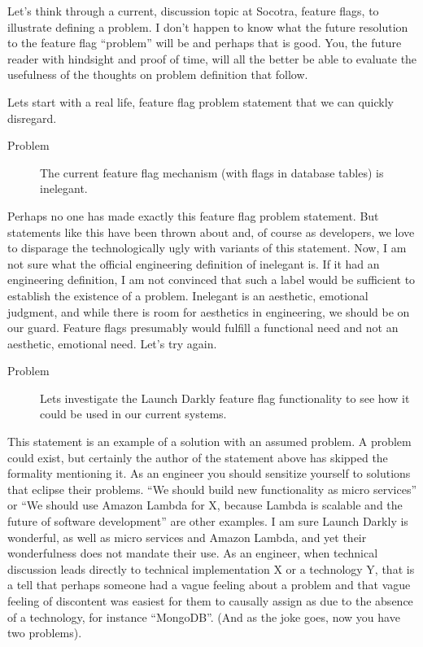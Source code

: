 Let's think through a current, discussion topic at Socotra, feature flags, to illustrate defining a problem. I don't happen to know what the
future resolution to the feature flag ``problem'' will be and perhaps that is good. You, the future reader with hindsight and proof of time, will
all the better be able to evaluate the usefulness of the thoughts on problem definition that follow.

Lets start with a real life, feature flag problem statement that we can quickly disregard.
\begin{description}
\item[Problem] The current feature flag
mechanism (with flags in database tables) is inelegant.
\end{description}
Perhaps no one has made exactly this feature flag problem statement. But statements like this have been thrown about and, of course as
developers, we love to disparage the technologically ugly with variants of this statement. Now, I am not sure what the official engineering
definition of inelegant is. If it had an engineering definition, I am not convinced that such a label would be sufficient to establish the
existence of a problem. Inelegant is an aesthetic, emotional judgment, and while there is room for aesthetics in engineering, we should be
on our guard. Feature flags presumably would fulfill a functional need and not an aesthetic, emotional need. Let's try again.

\begin{description}
\item[Problem] Lets investigate the Launch Darkly feature flag functionality to see how it could be used in our current systems.
\end{description}
This statement is an example of a solution with an assumed problem. A problem could exist, but certainly the author of the statement above
has skipped the formality mentioning it. As an engineer you should sensitize yourself to solutions that eclipse their problems.
``We should build new functionality as micro services'' or
``We should use Amazon Lambda for X, because Lambda is scalable and the future of software development'' are other examples. I am sure Launch Darkly is wonderful,
as well as micro services and Amazon Lambda, and yet their wonderfulness does not mandate their use. As an engineer, when technical discussion 
leads directly to technical implementation X or a technology Y, that is a tell that perhaps someone had a vague feeling about a
problem and that vague feeling of discontent was easiest for them to causally assign as due to the absence of a technology, for instance ``MongoDB''. (And as the joke goes, now
you have two problems).

